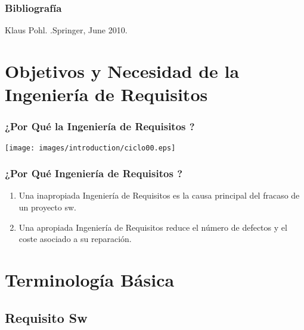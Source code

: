 \documentclass[a4paper,slidestop,xcolor=pst,dvips,blue]{beamer}
\begin{document}
\begin{frame}[c]
    \frametitle{Bibliografía}
    \begin{thebibliography}{1}
         Klaus Pohl. .\newblock Springer, June 2010.
    \end{thebibliography}
\end{frame}

\section{Objetivos y Necesidad de la Ingeniería de Requisitos}

\begin{frame}
    \frametitle{¿Por Qué la Ingeniería de Requisitos ?}
    \begin{center}
        \texttt{[image: images/introduction/ciclo00.eps]}
    \end{center}
\end{frame}

\begin{frame}[c]
    \frametitle{¿Por Qué Ingeniería de Requisitos ?}
    \begin{enumerate}[<+->]
        \item Una inapropiada Ingeniería de Requisitos es la causa principal del fracaso de un proyecto sw.
        \item Una apropiada Ingeniería de Requisitos reduce el número de defectos y el coste asociado a su reparación.
    \end{enumerate}
\end{frame}

\section{Terminología Básica}

\subsection{Requisito Sw}
\end{document}
